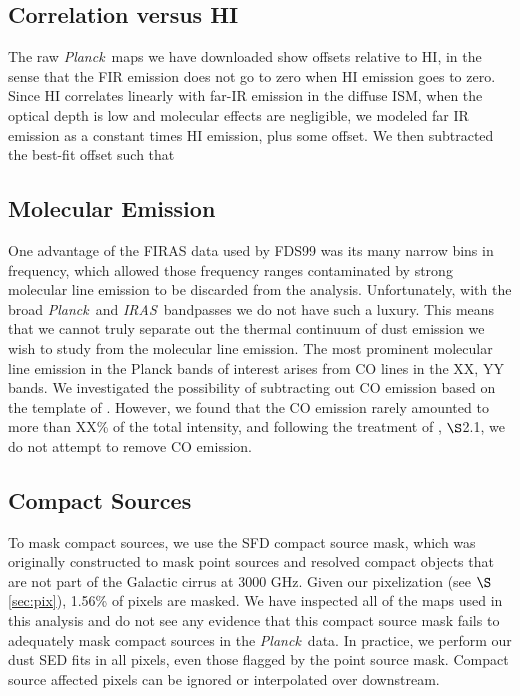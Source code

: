 \documentclass{emulateapj}
\newcommand{\IRAS}{{\it IRAS}}
\newcommand{\PLANCK}{{\it Planck}}
\begin{document}

\subsection{Correlation versus HI}
The raw \PLANCK~maps we have downloaded show offsets relative to HI, in the
sense that the FIR emission does not go to zero when HI emission goes to
zero. Since HI correlates linearly with far-IR emission in the diffuse ISM, 
when the optical depth is low and molecular effects are negligible, we modeled
far IR emission as a constant times HI emission, plus some offset. We then
subtracted the best-fit offset such that 

\subsection{Molecular Emission}
One advantage of the FIRAS data used by FDS99 was its many narrow bins in 
frequency, which allowed those frequency ranges contaminated by strong 
molecular line emission to be discarded from the analysis. Unfortunately, with 
the broad \PLANCK~and \IRAS~bandpasses we do not have such a luxury. This means
 that we cannot truly separate out the thermal continuum of dust emission we 
wish to study from the molecular line emission. The most prominent molecular 
line emission in the Planck bands of interest arises from CO lines in the XX, 
YY bands. We investigated the possibility of subtracting out CO emission based 
on the template of \cite{planckco}. However, we found that the CO emission
rarely amounted to more than XX\% of the total intensity, and following
the treatment of \cite{planckdust}, $\S$2.1, we do not attempt to remove CO
emission.

\subsection{Compact Sources}
To mask compact sources, we use the SFD compact source mask, which was 
originally constructed to mask point sources and resolved compact objects
that are not part of the Galactic cirrus at 3000 GHz. Given our pixelization 
(see $\S$\ref{sec:pix}), 1.56\% of pixels are masked. We have inspected all of 
the maps used in this analysis and do not see any evidence that this compact 
source mask fails to adequately mask compact sources in the \PLANCK~data. In 
practice, we perform our dust SED fits in all pixels, even those flagged by 
the point source mask. Compact source affected pixels can be ignored or 
interpolated over downstream.
\end{document}
